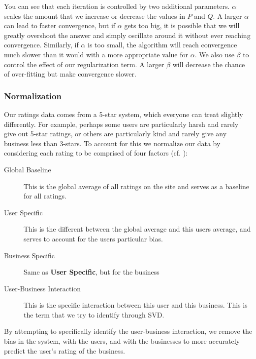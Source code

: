 You can see that each iteration is controlled by two additional parameters.
$\alpha$ scales the amount that we increase or decrease the values in $P$ and
$Q$. A larger $\alpha$ can lead to faster convergence, but if $\alpha$ gets too
big, it is possible that we will greatly overshoot the answer and simply
oscillate around it without ever reaching convergence. Similarly, if $\alpha$ is too small, the algorithm
will reach convergence much slower than it would with a more appropriate value for
$\alpha$. We also use $\beta$ to control the effect of our regularization term.
A larger $\beta$ will decrease the chance of over-fitting but make convergence
slower.

\subsubsection{Normalization}

Our ratings data comes from a 5-star system, which everyone can treat slightly
differently. For example, perhaps some users are particularly harsh and rarely
give out 5-star ratings, or others are particularly kind and rarely give any
business less than 3-stars. To account for this we normalize our data by
considering each rating to be comprised of four factors (cf. \cite{bellkor}): 

\begin{description}

  \item[Global Baseline] This is the global average of all ratings on the site
and serves as a baseline for all ratings.

  \item[User Specific] This is the different between the global average and
this users average, and serves to account for the users particular bias.

  \item[Business Specific] Same as \textbf{User Specific}, but for the business

  \item[User-Business Interaction] This is the specific interaction between this
user and this business. This is the term that we try to identify through SVD. 

\end{description}

By attempting to specifically identify the user-business interaction, we remove
the bias in the system, with the users, and with the businesses to more
accurately predict the user's rating of the business. 

